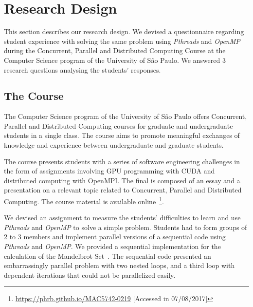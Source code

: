 \section{Research Design}
\label{sec:researchdesign}

This section describes our research design. We devised a questionnaire
regarding student experience with solving the same problem using
\textit{Pthreads} and \textit{OpenMP} during the Concurrent, Parallel and
Distributed Computing Course at the Computer Science program of the University
of São Paulo. We answered 3 research questions analysing the students'
responses.

\subsection{The Course}

The Computer Science program of the University of São Paulo offers Concurrent,
Parallel and Distributed Computing courses for graduate and undergraduate
students in a single class. The course aims to promote meaningful exchanges of
knowledge and experience between undergraduate and graduate students.

The course presents students with a series of software engineering challenges
in the form of assignments involving GPU programming with CUDA and distributed
computing with OpenMPI. The final is composed of an essay and a presentation on
a relevant topic related to Concurrent, Parallel and Distributed Computing.
The course material is available
online~\footnote{\url{https://phrb.github.io/MAC5742-0219} [Accessed in
07/08/2017]}.

We devised an assignment to measure the students' difficulties to learn and use
\textit{Pthreads} and \textit{OpenMP} to solve a simple problem. Students had
to form groups of 2 to 3 members and implement parallel versions of a
sequential code using \textit{Pthreads} and \textit{OpenMP}.  We provided a
sequential implementation for the calculation of the Mandelbrot
Set~\cite{douady1984etude}. The sequential code presented an embarrassingly
parallel problem with two nested loops, and a third loop with dependent
iterations that could not be parallelized easily.

